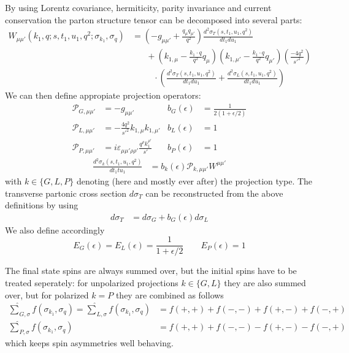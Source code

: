 By using Lorentz covariance, hermiticity, parity invariance and current conservation the parton structure tensor can be decomposed into several parts:
\begin{align}
W_{\mu\mu'}(k_1,q;s,t_1,u_1,q^2;\sigma_{k_1},\sigma_{q}) &= \left(-g_{\mu\mu'} + \frac{q_\mu q_{\mu'}}{q^2}\right)\frac{d^2\sigma_T(s,t_1,u_1,q^2)}{dt_1du_1} \nonumber\\
 &\hspace{20pt} +\left(k_{1,\mu}-\frac{k_1\cdot q}{q^2}q_\mu\right)\left(k_{1,\mu'}-\frac{k_1\cdot q}{q^2}q_{\mu'}\right)\left(\frac{-4q^2}{{s'}^2}\right) \nonumber\\
 &\hspace{30pt} \cdot\left(\frac{d^2\sigma_T(s,t_1,u_1,q^2)}{dt_1du_1}+\frac{d^2\sigma_L(s,t_1,u_1,q^2)}{dt_1du_1}\right)
\end{align}
We can then define appropiate projection operators\cite{Laenen1993162,Vogelsang:1993eg}:
\begin{align}
\mathcal P_{G,\mu\mu'} &= -g_{\mu\mu'} &b_G(\epsilon) &= \frac 1 {2(1+\epsilon/2)}\\
\mathcal P_{L,\mu\mu'} &= -\frac{4q^2}{{s'}^2} k_{1,\mu}k_{1,\mu'} &b_L(\epsilon) &= 1\\
\mathcal P_{P,\mu\mu'} &= i\varepsilon_{\mu\mu'\rho\rho'}\frac{q^{\rho}k_1^{\rho'}}{s'} &b_P(\epsilon) &= 1
\end{align}
\begin{align}
\frac{d^2\sigma_{k}(s,t_1,u_1,q^2)}{dt_1tu_1} &= b_k(\epsilon)\mathcal P_{k,\mu\mu'}W^{\mu\mu'}
\end{align}
with $k\in\{G,L,P\}$ denoting (here and mostly ever after) the projection type. The transverse partonic cross section $d\sigma_T$ can be reconstructed from the above definitions by using
\begin{align}
d\sigma_T &= d\sigma_G + b_G(\epsilon)d\sigma_L
\end{align}
We also define accordingly
\begin{equation}
E_G(\epsilon) = E_L(\epsilon) = \frac 1 {1+\epsilon/2} \qquad E_P(\epsilon) = 1
\end{equation}

The final state spins are always summed over, but the initial spins have to be treated seperately: for unpolarized projections $k\in\{G,L\}$ they are also summed over, but for polarized $k=P$ they are combined as follows
\begin{align}
\hat\sum_{G,\sigma} f(\sigma_{k_1},\sigma_q) = \hat\sum_{L,\sigma} f(\sigma_{k_1},\sigma_q) &= f(+,+)+f(-,-)+f(+,-)+f(-,+)\\
\hat\sum_{P,\sigma} f(\sigma_{k_1},\sigma_q) &= f(+,+)+f(-,-)-f(+,-)-f(-,+)
\end{align}
which keeps spin asymmetries well behaving.

